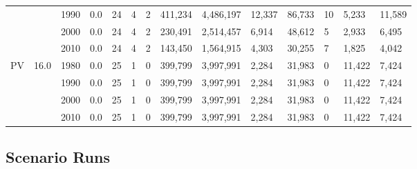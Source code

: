 \begin{table}[]
\begin{tabular}{|l|l|l|l|l|l|l|l|l|l|l|l|l|l|}
	&  & 1990 & 0.0 & 24 & 4 & 2 & 411,234 & 4,486,197 & 12,337 & 86,733 & 10 & 5,233 & 11,589 \\ \cline{3-14} 
	&  & 2000 & 0.0 & 24 & 4 & 2 & 230,491 & 2,514,457 & 6,914 & 48,612 & 5 & 2,933 & 6,495 \\ \cline{3-14} 
	&  & 2010 & 0.0 & 24 & 4 & 2 & 143,450 & 1,564,915 & 4,303 & 30,255 & 7 & 1,825 & 4,042 \\ \hline
	\multirow{4}{*}{PV} & \multirow{4}{*}{16.0} & 1980 & 0.0 & 25 & 1 & 0 & 399,799 & 3,997,991 & 2,284 & 31,983 & 0 & 11,422 & 7,424 \\ \cline{3-14} 
	&  & 1990 & 0.0 & 25 & 1 & 0 & 399,799 & 3,997,991 & 2,284 & 31,983 & 0 & 11,422 & 7,424 \\ \cline{3-14} 
	&  & 2000 & 0.0 & 25 & 1 & 0 & 399,799 & 3,997,991 & 2,284 & 31,983 & 0 & 11,422 & 7,424 \\ \cline{3-14} 
	&  & 2010 & 0.0 & 25 & 1 & 0 & 399,799 & 3,997,991 & 2,284 & 31,983 & 0 & 11,422 & 7,424 \\ \hline
	\end{tabular}
	\label{table:historic_plant_costs}
\end{table}

\clearpage

\subsection{Scenario Runs}







